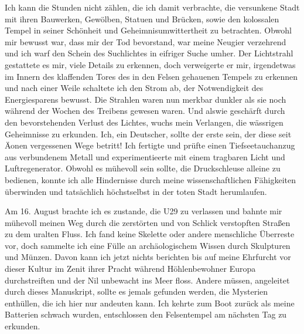 \documentclass[a4paper]{memoir}
\begin{document}
Ich kann die Stunden nicht zählen, die ich damit verbrachte, die versunkene Stadt mit ihren Bauwerken, Gewölben, Statuen und Brücken, sowie den kolossalen Tempel in seiner Schönheit und Geheimnisumwittertheit zu betrachten. Obwohl mir bewusst war, dass mir der Tod bevorstand, war meine Neugier verzehrend und ich warf den Schein des Suchlichtes in eifriger Suche umher. Der Lichtstrahl gestattete es mir, viele Details zu erkennen, doch verweigerte er mir, irgendetwas im Innern des klaffenden Tores des in den Felsen gehauenen Tempels zu erkennen und nach einer Weile schaltete ich den Strom ab, der Notwendigkeit des Energiesparens bewusst. Die Strahlen waren nun merkbar dunkler als sie noch während der Wochen des Treibens gewesen waren. Und alswie geschärft durch den bevorstehenden Verlust des Lichtes, wuchs mein Verlangen, die wässrigen Geheimnisse zu erkunden. Ich, ein Deutscher, sollte der erste sein, der diese seit Äonen vergessenen Wege betritt! Ich fertigte und prüfte einen Tiefseetauchanzug aus verbundenem Metall und experimentieerte mit einem tragbaren Licht und Luftregenerator. Obwohl es mühevoll sein sollte, die Druckschleuse alleine zu bedienen, konnte ich alle Hindernisse durch meine wissenschaftlichen Fähigkeiten überwinden und tatsächlich höchstselbst in der toten Stadt herumlaufen.

Am 16. August brachte ich es zustande, die U29 zu verlassen und bahnte mir mühevoll meinen Weg durch die zerstörten und von Schlick verstopften Straßen zu dem uralten Fluss. Ich fand keine Skelette oder andere menschliche Überreste vor, doch sammelte ich eine Fülle an archäologischem Wissen durch Skulpturen und Münzen. Davon kann ich jetzt nichts berichten bis auf meine Ehrfurcht vor dieser Kultur im Zenit ihrer Pracht während Höhlenbewohner Europa durchstreiften und der Nil unbewacht ins Meer floss. Andere müssen, angeleitet durch dieses Manuskript, sollte es jemals gefunden werden, die Mysterien enthüllen, die ich hier nur andeuten kann. Ich kehrte zum Boot zurück als meine Batterien schwach wurden, entschlossen den Felsentempel am nächsten Tag zu erkunden.
\end{document}
